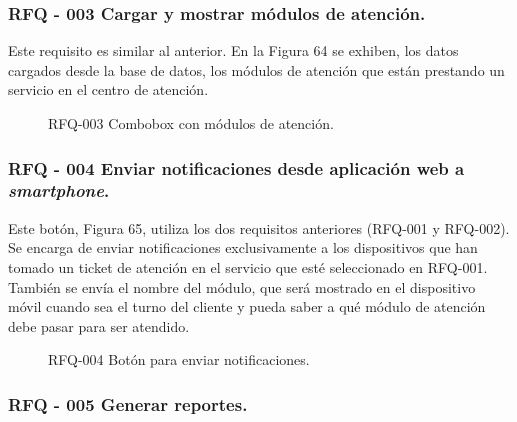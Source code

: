 \subsubsection{RFQ - 003 Cargar y mostrar módulos de atención.}

Este requisito es similar al anterior. En la Figura 64 se exhiben, los datos cargados desde la base de datos, los módulos de atención que están prestando un servicio en el centro de atención.

\begin{figure}[H]
\centering
\setlength\fboxsep{0pt}
\setlength\fboxrule{0.5pt}
\caption{RFQ-003 Combobox con módulos de atención.}
\label{rfq003}
\end{figure}

\subsubsection{RFQ - 004 Enviar notificaciones desde aplicación web a \textit{smartphone}.}

Este botón, Figura 65, utiliza los dos requisitos anteriores (RFQ-001 y RFQ-002). Se encarga de enviar notificaciones exclusivamente a los dispositivos que han tomado un ticket de atención en el servicio que esté seleccionado en RFQ-001. También se envía el nombre del módulo, que será mostrado en el dispositivo móvil cuando sea el turno del cliente y pueda saber a qué módulo de atención debe pasar para ser atendido.

\begin{figure}[H]
\centering
\setlength\fboxsep{0pt}
\setlength\fboxrule{0.5pt}
\caption{RFQ-004 Botón para enviar notificaciones.}
\label{rfq005}
\end{figure}


\subsubsection{RFQ - 005  Generar reportes.}


